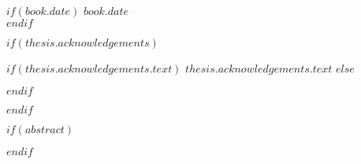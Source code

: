\begin{titlepage}
\begin{center}
\vfill

 


$if(book.date)$
{\large $book.date$}\\[4cm] %
$endif$

 
\vfill
\end{center}
\end{titlepage}

$if(thesis.acknowledgements)$

\begin{acknowledgements}
\addchaptertocentry{\acknowledgementname} %
$if(thesis.acknowledgements.text)$
$thesis.acknowledgements.text$
$else$

$endif$
\end{acknowledgements}

$endif$

$if(abstract)$

\begin{abstract}
\addchaptertocentry{\abstractname} %
$abstract$
\end{abstract}
$endif$


